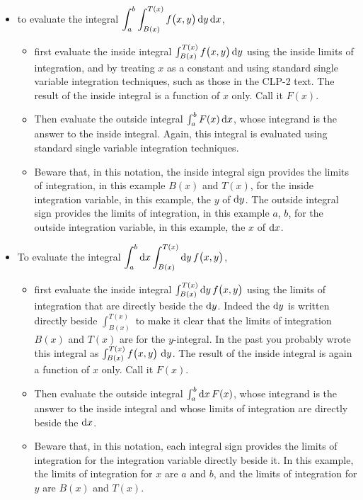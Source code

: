 \begin{itemize}
\item 
to evaluate the integral 
$\displaystyle\int_a^b \int_{B(x)}^{T(x)} f\big(x,y\big)\,\mathrm{d}y\,\mathrm{d}x$,
\begin{itemize}
  \item
  first evaluate the inside integral 
  $\int_{B(x)}^{T(x)} f\big(x,y\big)\,\mathrm{d}y$ using the inside
  limits of integration, and by treating $x$ as a constant and using 
  standard single variable integration techniques, such as those in the
  CLP-2 text. The result of the 
  inside integral is a function of $x$ only.  Call it $F(x)$.
  \item
   Then evaluate the outside integral $\int_a^b F(x)\,\mathrm{d}x$,
   whose integrand is the answer to the inside integral. Again, this
   integral is evaluated using standard single variable integration 
   techniques.
  \item
    Beware that, in this notation, the inside integral sign provides the limits
    of integration, in this example $B(x)$ and $T(x)$, for the inside 
    integration variable, in this example, the $y$ of $\mathrm{d}y$. The outside 
    integral sign provides the limits of integration, in this example $a$, $b$, 
    for the outside integration variable, in this example, the $x$ of $\mathrm{d}x$. 
\end{itemize}

\item
To evaluate the integral 
$\displaystyle\int_a^b \mathrm{d}x \int_{B(x)}^{T(x)} \mathrm{d}y\, f\big(x,y\big)$,
\begin{itemize}
  \item
  first evaluate the inside integral 
  $\int_{B(x)}^{T(x)} \mathrm{d}y\, f\big(x,y\big)$ using the limits of 
  integration that are directly beside the $\mathrm{d}y$. Indeed the $\mathrm{d}y$
  is written directly beside $\int_{B(x)}^{T(x)}$ to make it clear that
  the limits of integration $B(x)$ and $T(x)$ are for the $y$-integral.
  In the past you probably wrote this integral as 
  $\int_{B(x)}^{T(x)} f\big(x,y\big)\ \mathrm{d}y$. The result of 
  the inside integral is again a function of $x$ only.  Call it $F(x)$.
  \item
   Then evaluate the outside integral $\int_a^b \mathrm{d}x\,F(x)$,
   whose integrand is the answer to the inside integral and whose limits
   of integration are directly beside the $\mathrm{d}x$.
  \item
  Beware that, in this notation, each integral sign provides the limits
    of integration for the integration variable directly beside it. In this
    example, the limits of integration for $x$ are $a$ and $b$, and the limits
    of integration for $y$ are $B(x)$ and $T(x)$.
  

\end{itemize}
\end{itemize}
